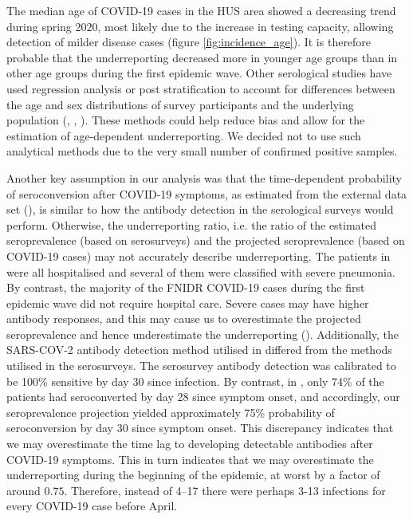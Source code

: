 \documentclass[aoas]{imsart}
\begin{document}
The median age of COVID-19 cases in the HUS area showed a decreasing trend during spring 2020, most likely due to the increase in testing capacity, allowing detection of milder disease cases (figure \ref{fig:incidence_age}). It is therefore probable that the underreporting decreased more in younger age groups than in other age groups during the first epidemic wave. Other serological studies have used regression analysis or post stratification to account for differences between the age and sex distributions of survey participants and the underlying population (\cite{Stringhini2020}, \cite{merkely2020},  \cite{Pollan2020}). These methods could help reduce bias and allow for the estimation of age-dependent underreporting. We decided not to use such analytical methods due to the very small number of confirmed positive samples.

Another key assumption in our analysis was that the time-dependent probability of seroconversion after COVID-19 symptoms, as estimated from the external data set (\cite{Tan2020}), is similar to how the antibody detection in the serological surveys would perform. Otherwise, the underreporting ratio, i.e. the ratio of the estimated seroprevalence (based on serosurveys) and the projected seroprevalence (based on COVID-19 cases) may not accurately describe underreporting. The patients in \cite{Tan2020} were all hospitalised and several of them were classified with severe pneumonia. By contrast, the majority of the FNIDR COVID-19 cases during the first epidemic wave did not require hospital care. Severe cases may have higher antibody responses, and this may cause us to overestimate the projected seroprevalence and hence underestimate the underreporting (\cite{haveri2021}). Additionally, the SARS-COV-2 antibody detection method utilised in \cite{Tan2020} differed from the methods utilised in the serosurveys. The serosurvey antibody detection was calibrated to be 100\% sensitive by day 30 since infection. By contrast, in \cite{Tan2020}, only 74\% of the patients had seroconverted by day 28 since symptom onset, and accordingly, our seroprevalence projection yielded approximately 75\% probability of seroconversion by day 30 since symptom onset. This discrepancy indicates that we may overestimate the time lag to developing detectable antibodies after COVID-19 symptoms. This in turn indicates that we may overestimate the underreporting during the beginning of the epidemic, at worst by a factor of around $0.75$. Therefore, instead of 4–17 there were perhaps 3-13 infections for every COVID-19 case before April. 
\end{document}
